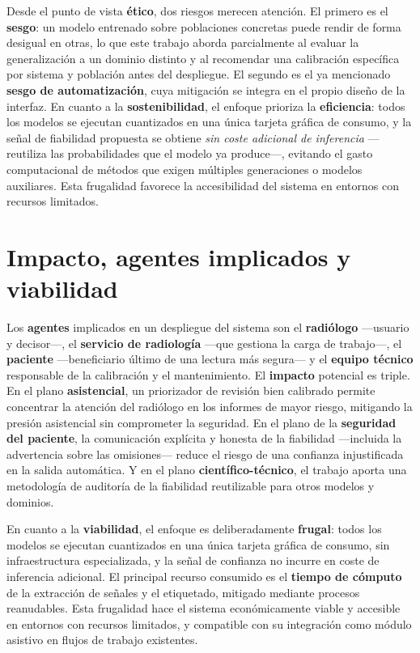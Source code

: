 Desde el punto de vista \textbf{ético}, dos riesgos merecen atención. El primero es el \textbf{sesgo}:
un modelo entrenado sobre poblaciones concretas puede rendir de forma desigual en otras, lo que este
trabajo aborda parcialmente al evaluar la generalización a un dominio distinto y al recomendar una
calibración específica por sistema y población antes del despliegue. El segundo es el ya mencionado
\textbf{sesgo de automatización}, cuya mitigación se integra en el propio diseño de la interfaz. En
cuanto a la \textbf{sostenibilidad}, el enfoque prioriza la \textbf{eficiencia}: todos los modelos se
ejecutan cuantizados en una única tarjeta gráfica de consumo, y la señal de fiabilidad propuesta se
obtiene \emph{sin coste adicional de inferencia} —reutiliza las probabilidades que el modelo ya
produce—, evitando el gasto computacional de métodos que exigen múltiples generaciones o modelos
auxiliares. Esta frugalidad favorece la accesibilidad del sistema en entornos con recursos limitados.

\section{Impacto, agentes implicados y viabilidad}
Los \textbf{agentes} implicados en un despliegue del sistema son el \textbf{radiólogo} —usuario y
decisor—, el \textbf{servicio de radiología} —que gestiona la carga de trabajo—, el \textbf{paciente}
—beneficiario último de una lectura más segura— y el \textbf{equipo técnico} responsable de la
calibración y el mantenimiento. El \textbf{impacto} potencial es triple. En el plano
\textbf{asistencial}, un priorizador de revisión bien calibrado permite concentrar la atención del
radiólogo en los informes de mayor riesgo, mitigando la presión asistencial sin comprometer la
seguridad. En el plano de la \textbf{seguridad del paciente}, la comunicación explícita y honesta de
la fiabilidad —incluida la advertencia sobre las omisiones— reduce el riesgo de una confianza
injustificada en la salida automática. Y en el plano \textbf{científico-técnico}, el trabajo aporta
una metodología de auditoría de la fiabilidad reutilizable para otros modelos y dominios.

En cuanto a la \textbf{viabilidad}, el enfoque es deliberadamente \textbf{frugal}: todos los modelos
se ejecutan cuantizados en una única tarjeta gráfica de consumo, sin infraestructura especializada, y
la señal de confianza no incurre en coste de inferencia adicional. El principal recurso consumido es
el \textbf{tiempo de cómputo} de la extracción de señales y el etiquetado, mitigado mediante procesos
reanudables. Esta frugalidad hace el sistema económicamente viable y accesible en entornos con
recursos limitados, y compatible con su integración como módulo asistivo en flujos de trabajo
existentes.

